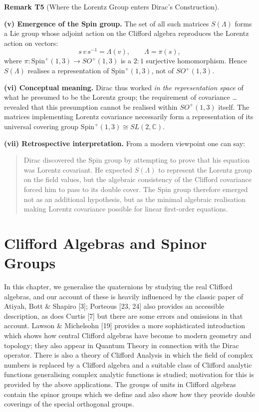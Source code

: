 \documentclass[10pt, letterpaper]{article}
\newcommand{\C}{\mathbb{C}}
\newcommand{\Spin}{\mathrm{Spin}}
\newcommand{\CustomHeading}[3]{%
  \par\medskip\noindent%
  \textbf{#1 #2} \textnormal{(#3)}.\enskip%
}
\newenvironment{REM}[2]{\begin{unitbox}\CustomHeading{Remark}{#1}{#2}}{\end{unitbox}}
\begin{document}
\begin{REM}{T5}{Where the Lorentz Group enters Dirac’s Construction}
\medskip

\textbf{(v) Emergence of the Spin group.}  
The set of all such matrices $S(\Lambda)$ forms a Lie group whose adjoint action on the Clifford algebra reproduces the Lorentz action on vectors:
\[
s\,v\,s^{-1} = \Lambda(v),
\qquad \Lambda = \pi(s),
\]
where $\pi:\Spin^+(1,3)\to SO^+(1,3)$ is a $2\!:\!1$ surjective homomorphism.  
Hence $S(\Lambda)$ realises a representation of $\Spin^+(1,3)$, not of $SO^+(1,3)$.

\medskip

\textbf{(vi) Conceptual meaning.}  
Dirac thus worked \emph{in the representation space} of what he presumed to be the Lorentz group;  
the requirement of covariance … revealed that this presumption cannot be realised within $SO^+(1,3)$ itself.  
The matrices implementing Lorentz covariance necessarily form a representation of its universal covering group $\Spin^+(1,3)\cong SL(2,\C)$.

\medskip

\textbf{(vii) Retrospective interpretation.}  
From a modern viewpoint one can say:
\begin{quote}
Dirac discovered the Spin group by attempting to prove that his equation was Lorentz covariant.  
He expected $S(\Lambda)$ to represent the Lorentz group on the field values, but the algebraic consistency of the Clifford covariance forced him to pass to its double cover.  
The Spin group therefore emerged not as an additional hypothesis, but as the minimal algebraic realisation making Lorentz covariance possible for linear first-order equations.
\end{quote}

\end{REM}

\pagebreak






\section{Clifford Algebras and Spinor Groups}
In this chapter, we generalise the quaternions by studying the real Clifford algebras, and our account of these is heavily influenced by the classic paper of Atiyah, Bott \& Shapiro [3]; Porteous [23, 24] also provides an accessible description, as does Curtis [7] but there are some errors and omissions in that account. Lawson \& Michelsohn [19] provides a more sophisticated introduction which shows how central Clifford algebras have become to modern geometry and topology; they also appear in Quantum Theory in connection with the Dirac operator. There is also a theory of Clifford Analysis in which the field of complex numbers is replaced by a Clifford algebra and a suitable class of Clifford analytic functions generalising complex analytic functions is studied; motivation for this is provided by the above applications. The groups of units in Clifford algebras contain the spinor groups which we define and also show how they provide double coverings of the special orthogonal groups.
\end{document}
